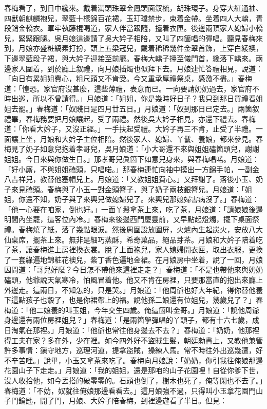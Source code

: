 春梅看了，到日中纔來。戴着滿頭珠翠金鳳頭面釵梳，胡珠環子。身穿大紅通袖、四獸朝麒麟袍兒，翠藍十樣錦百花裙，玉玎璫禁步，束着金帶。坐着四人大轎，青段銷金轎衣。軍牢執藤棍喝道，家人伴當跟隨，擡着衣匣。後邊兩頂家人媳婦小轎兒，緊緊跟隨。{}吳月娘這邊請了吳大妗子相陪，又叫了四箇唱的彈唱。聽見春梅來到，月娘亦盛粧縞素打扮，頭上五梁冠兒，戴着稀稀幾件金翠首飾，{}上穿白綾襖，下邊翠藍段子裙，與大妗子迎接至前廳。春梅大轎子擡至儀門首，纔落下轎來。兩邊家人圍着，到於廳上叙禮，向月娘插燭也似拜下去。月娘連忙答禮相見，說道：「向日有累姐姐費心，粗尺頭又不肯受。今又重承厚禮祭桌，感激不盡。」春梅道：「惶恐。家官府沒甚麼，這些薄禮，表意而已。一向要請奶奶過去，家官府不時出巡，所以不曾請得。」月娘道：「姐姐，你是幾時好日子？我只到那日買禮看姐姐去罷。」{}春梅道：「奴賤日是四月廿五日。」月娘道：「奴到那日已定去。」兩箇叙禮畢，春梅務要把月娘讓起，受了兩禮。然後吳大妗子相見，亦還下禮去。春梅道：「你看大妗子，又沒正經。」一手扶起受禮。大妗子再三不肯，止受了半禮。一面讓上坐，月娘和大妗子主位相陪。然後家人、媳婦、丫鬟、養娘，都來參見。春梅見了奶子如意兒抱着孝哥兒，吳月娘道：「小大哥還不來與姐姐磕箇頭兒，謝謝姐姐。今日來與你做生日。」那孝哥兒眞箇下如意兒身來，與春梅唱喏。月娘道：「好小厮，不與姐姐磕頭，只唱喏。」那春梅連忙向袖中摸出一方錦手帕，一副金八吉祥兒，教替他塞帽兒上。月娘道：「又教姐姐費心。」又拜謝了。落後小玉、奶子來見磕頭。春梅與了小玉一對金頭簪子，{}與了奶子兩枝銀簪兒。月娘道：「姐姐，你還不知，奶子與了來興兒做媳婦兒了。來興兒那媳婦害病沒了。」春梅道：「他一心要在咱家，倒也好。」{}一面丫鬟拿茶上來，吃了茶，月娘道：「請娘娘後邊明間內坐罷，這客位內冷。」春梅來後邊西門慶靈前，又早點起燈燭，擺下桌面祭禮。春梅燒了紙，落了幾點眼淚。{}然後周圍設放圍屏，火爐內生起炭火，安放八大仙桌席，擺茶上來。無非是細巧蒸酥，希奇菓品，絕品芽茶。月娘和大妗子陪着吃了茶，讓春梅進上房裡換衣裳。脫了上面袍兒，家人媳婦開衣匣，取出衣服，更換了一套綠遍地錦粧花襖兒，紫丁香色遍地金裙。在月娘房中坐着，說了一回，月娘因問道：「哥兒好麼？今日怎不帶他來這裡走走？」春梅道：「不是也帶他來與奶奶磕頭，他爺說天氣寒冷，怕風冒着他。他又不肯在房裡，只要那當直的抱出來廳上外邊走。{}這兩日，不知怎的，只是哭。」月娘道：「他周爺也好大年紀，得你替他養下這點孩子也彀了，也是你裙帶上的福。說他孫二娘還有位姐兒，幾歲兒了？」春梅道：「他二娘養的叫玉姐，今年交生四歲。俺這箇叫金哥。」月娘道：「說他周爺身邊還有兩位房裡姐兒？」春梅道：「是兩箇學彈唱的丫頭子，都有十六七歲，成日淘氣在那裡。」月娘道：「他爺也常往他身邊去不去？」{}春梅道：「奶奶，他那裡得工夫在家？多在外，少在裡。如今四外好不盜賊生髮，朝廷勑書上，又教他兼管許多事情：鎭守地方，巡理河道，提拿盜賊，操練人馬。常不時往外出巡幾遭，好不辛苦哩。」說畢，小玉又拿茶來吃了。春梅向月娘說：「奶奶，你引我往俺娘那邊花園山子下走走。」月娘道：「我的姐姐，還是那咱的山子花園哩！自從你爹下世，沒人收拾他，如今丟搭的破零零的。石頭也倒了，樹木也死了，俺等閑也不去了。」春梅道：「不妨，奴就往俺娘那邊看看去。」這月娘強不過，只得叫小玉拿花園門山子門鑰匙，開了門，月娘、大妗子陪春梅，到裡邊遊看了半日。但見：

